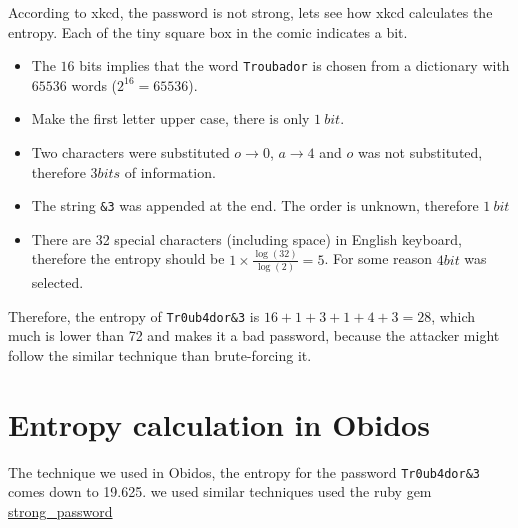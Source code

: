 According to xkcd,
the password is not strong, lets see how xkcd calculates the entropy. Each of
the tiny square box in the comic indicates a bit. 
\begin{itemize}
    \item The $16$ bits implies that the word 
\texttt{Troubador} is chosen from a dictionary with $65536$ words ($2^{16} = 65536$).
    \item Make the first letter upper case, there is only $1\ bit$.
    \item Two characters were substituted $o \rightarrow 0$, $a \rightarrow 4$ and $o$ was
not substituted, therefore $3 bits$ of information.
    \item The string \texttt{\&3} was appended at the end. The order is unknown, therefore $1\ bit$
    \item There are 32 special characters (including space) in English keyboard, therefore the entropy should
be $1 \times \frac{\log(32)} {\log(2)} = 5$. For some reason $4 bit$ was selected.
\end{itemize}


Therefore, the entropy of \texttt{Tr0ub4dor\&3} is $ 16 + 1 + 3 + 1 + 4 + 3 = 28$, which much 
is lower than 72 and makes it a bad password, because the attacker might follow
the similar technique than brute-forcing it.

\section{Entropy calculation in Obidos}
The technique we used in Obidos, the entropy for the password \texttt{Tr0ub4dor\&3}
comes down to 19.625. we used similar techniques used the ruby gem 
\href{https://github.com/bdmac/strong_password}{strong\_password}

